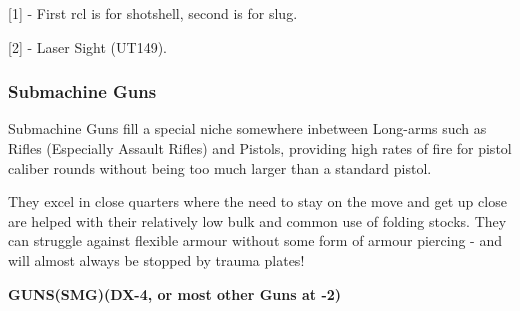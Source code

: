 [1] - First rcl is for shotshell, second is for slug.

[2] - Laser Sight (UT149).

\subsubsection{Submachine Guns}

Submachine Guns fill a special niche somewhere inbetween Long-arms such as Rifles (Especially Assault Rifles) and Pistols, providing high rates of fire for pistol caliber rounds without being too much larger than a standard pistol. 

They excel in close quarters where the need to stay on the move and get up close are helped with their relatively low bulk and common use of folding stocks. They can struggle against flexible armour without some form of armour piercing - and will almost always be stopped by trauma plates!

\textbf{GUNS(SMG)(DX-4, or most other Guns at -2)}
\begin{center} 
	\begin{adjustwidth}{-8mm}{}
	\end{adjustwidth}
\end{center}

